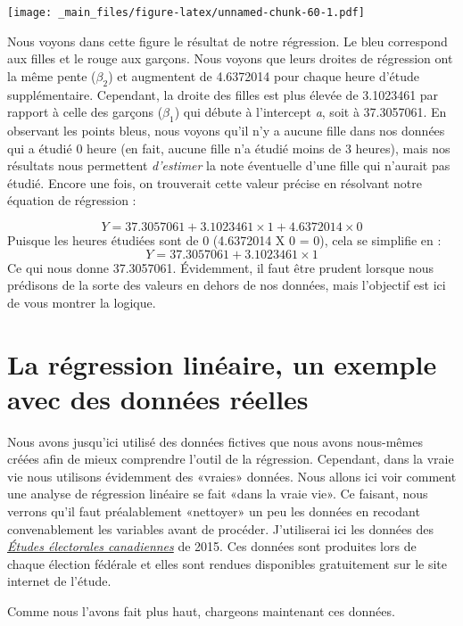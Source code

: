 \documentclass[
]{book}
\begin{document}
\texttt{[image: \_main\_files/figure-latex/unnamed-chunk-60-1.pdf]}

Nous voyons dans cette figure le résultat de notre régression. Le bleu correspond aux filles et le rouge aux garçons. Nous voyons que leurs droites de régression ont la même pente (\(\beta_2\)) et augmentent de 4.6372014 pour chaque heure d'étude supplémentaire. Cependant, la droite des filles est plus élevée de 3.1023461 par rapport à celle des garçons (\(\beta_1\)) qui débute à l'intercept \emph{a}, soit à 37.3057061. En observant les points bleus, nous voyons qu'il n'y a aucune fille dans nos données qui a étudié 0 heure (en fait, aucune fille n'a étudié moins de 3 heures), mais nos résultats nous permettent \emph{d'estimer} la note éventuelle d'une fille qui n'aurait pas étudié. Encore une fois, on trouverait cette valeur précise en résolvant notre équation de régression :

\[Y =  37.3057061 + 3.1023461 \times 1 + 4.6372014 \times 0\]
Puisque les heures étudiées sont de 0 (4.6372014 X 0 = 0), cela se simplifie en :
\[Y =  37.3057061 + 3.1023461 \times 1\]
Ce qui nous donne 37.3057061. Évidemment, il faut être prudent lorsque nous prédisons de la sorte des valeurs en dehors de nos données, mais l'objectif est ici de vous montrer la logique.

\hypertarget{la-ruxe9gression-linuxe9aire-un-exemple-avec-des-donnuxe9es-ruxe9elles}{%
\section{La régression linéaire, un exemple avec des données réelles}\label{la-ruxe9gression-linuxe9aire-un-exemple-avec-des-donnuxe9es-ruxe9elles}}

Nous avons jusqu'ici utilisé des données fictives que nous avons nous-mêmes créées afin de mieux comprendre l'outil de la régression. Cependant, dans la vraie vie nous utilisons évidemment des «vraies» données. Nous allons ici voir comment une analyse de régression linéaire se fait «dans la vraie vie». Ce faisant, nous verrons qu'il faut préalablement «nettoyer» un peu les données en recodant convenablement les variables avant de procéder. J'utiliserai ici les données des \href{https://ces-eec.arts.ubc.ca/french-section/enquetes/}{\emph{Études électorales canadiennes}} de 2015. Ces données sont produites lors de chaque élection fédérale et elles sont rendues disponibles gratuitement sur le site internet de l'étude.

Comme nous l'avons fait plus haut, chargeons maintenant ces données.
\end{document}
